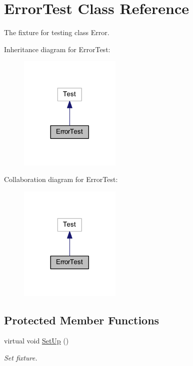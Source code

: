 \hypertarget{class_error_test}{}\section{Error\+Test Class Reference}
\label{class_error_test}


The fixture for testing class Error.  




Inheritance diagram for Error\+Test\+:
\nopagebreak
\begin{figure}[H]
\begin{center}
\leavevmode
\includegraphics[width=137pt]{class_error_test__inherit__graph}
\end{center}
\end{figure}


Collaboration diagram for Error\+Test\+:
\nopagebreak
\begin{figure}[H]
\begin{center}
\leavevmode
\includegraphics[width=137pt]{class_error_test__coll__graph}
\end{center}
\end{figure}
\subsection*{Protected Member Functions}
\begin{DoxyCompactItemize}
\item 
\hypertarget{class_error_test_a282955d762cb937af68efea62c37fccd}{}\label{class_error_test_a282955d762cb937af68efea62c37fccd} 
virtual void \hyperlink{class_error_test_a282955d762cb937af68efea62c37fccd}{Set\+Up} ()
\begin{DoxyCompactList}\small\item\em Set fixture. \end{DoxyCompactList}\end{DoxyCompactItemize}
